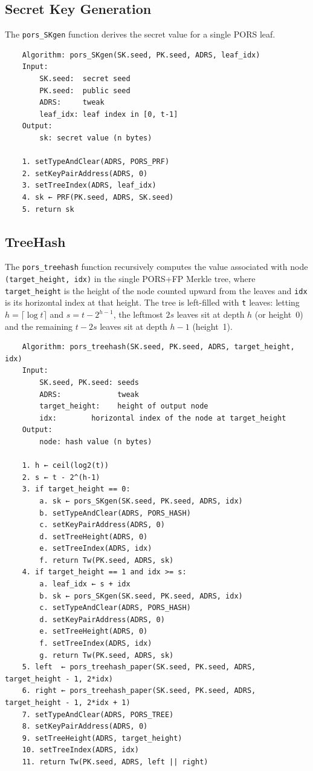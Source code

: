 \subsection{Secret Key Generation}
 
The \texttt{pors\_SKgen} function derives the secret value for a single PORS leaf.
 
\begin{verbatim}
    Algorithm: pors_SKgen(SK.seed, PK.seed, ADRS, leaf_idx)
    Input:
        SK.seed:  secret seed
        PK.seed:  public seed
        ADRS:     tweak
        leaf_idx: leaf index in [0, t-1]
    Output:
        sk: secret value (n bytes)
 
    1. setTypeAndClear(ADRS, PORS_PRF)
    2. setKeyPairAddress(ADRS, 0)
    3. setTreeIndex(ADRS, leaf_idx)
    4. sk ← PRF(PK.seed, ADRS, SK.seed)
    5. return sk
\end{verbatim}

\subsection{TreeHash}

The \texttt{pors\_treehash} function recursively computes the value associated with
node \texttt{(target\_height, idx)} in the single PORS+FP Merkle tree, where
\texttt{target\_height} is the height of the node counted upward from the leaves and \texttt{idx}
is its horizontal index at that height. The tree is left-filled with \texttt{t} leaves: letting $h = \lceil \log t \rceil$ and $s = t - 2^{h-1}$, the
leftmost $2s$ leaves sit at depth $h$ (or height~0) and the
remaining $t - 2s$ leaves sit at depth $h - 1$ (height~1).

\begin{verbatim}
    Algorithm: pors_treehash(SK.seed, PK.seed, ADRS, target_height, idx)
    Input:
        SK.seed, PK.seed: seeds
        ADRS:             tweak
        target_height:    height of output node
        idx:        horizontal index of the node at target_height
    Output:
        node: hash value (n bytes)

    1. h ← ceil(log2(t))
    2. s ← t - 2^(h-1)
    3. if target_height == 0:
        a. sk ← pors_SKgen(SK.seed, PK.seed, ADRS, idx)
        b. setTypeAndClear(ADRS, PORS_HASH)
        c. setKeyPairAddress(ADRS, 0)
        d. setTreeHeight(ADRS, 0)
        e. setTreeIndex(ADRS, idx)
        f. return Tw(PK.seed, ADRS, sk)
    4. if target_height == 1 and idx >= s:
        a. leaf_idx ← s + idx
        b. sk ← pors_SKgen(SK.seed, PK.seed, ADRS, idx)
        c. setTypeAndClear(ADRS, PORS_HASH)
        d. setKeyPairAddress(ADRS, 0)
        e. setTreeHeight(ADRS, 0)
        f. setTreeIndex(ADRS, idx)
        g. return Tw(PK.seed, ADRS, sk)
    5. left  ← pors_treehash_paper(SK.seed, PK.seed, ADRS, target_height - 1, 2*idx)
    6. right ← pors_treehash_paper(SK.seed, PK.seed, ADRS, target_height - 1, 2*idx + 1)
    7. setTypeAndClear(ADRS, PORS_TREE)
    8. setKeyPairAddress(ADRS, 0)
    9. setTreeHeight(ADRS, target_height)
    10. setTreeIndex(ADRS, idx)
    11. return Tw(PK.seed, ADRS, left || right)
\end{verbatim}

